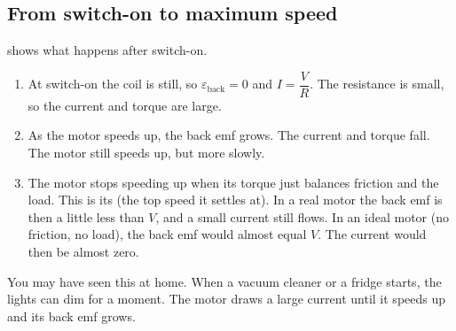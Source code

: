 \subsection{From switch-on to maximum speed}
 shows what happens after switch-on.
\begin{enumerate}
  \item At switch-on the coil is still, so $\varepsilon_\mathrm{back} = 0$ and
        $I = \dfrac{V}{R}$. The resistance is small, so the current and torque are large.
  \item As the motor speeds up, the back emf grows. The current and torque fall. The
        motor still speeds up, but more slowly.
  \item The motor stops speeding up when its torque just balances friction and the
        load. This is its  (the top speed it settles at). In a real
        motor the back emf is then a little less than $V$, and a small current still
        flows. In an ideal motor (no friction, no load), the back emf would almost equal
        $V$. The current would then be almost zero.
\end{enumerate}
You may have seen this at home. When a vacuum cleaner or a fridge starts, the lights
can dim for a moment. The motor draws a large current until it speeds up and its back
emf grows.

